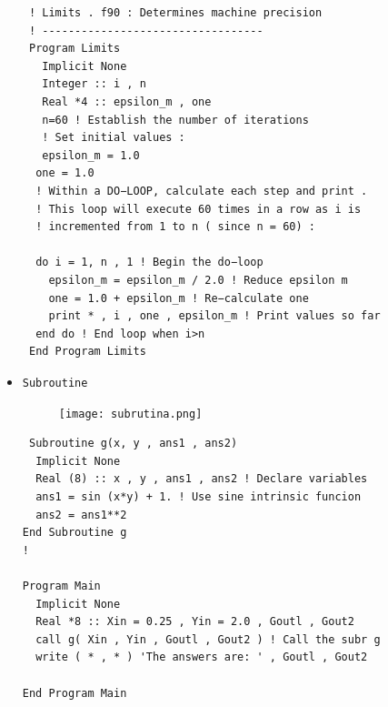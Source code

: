 \documentclass[12pt]{article}
\begin{document}
\begin{itemize}
 \begin{verbatim}
 ! Limits . f90 : Determines machine precision
 ! ----------------------------------
 Program Limits
   Implicit None
   Integer :: i , n
   Real *4 :: epsilon_m , one
   n=60 ! Establish the number of iterations
   ! Set initial values :
   epsilon_m = 1.0
  one = 1.0
  ! Within a DO−LOOP, calculate each step and print .
  ! This loop will execute 60 times in a row as i is
  ! incremented from 1 to n ( since n = 60) :

  do i = 1, n , 1 ! Begin the do−loop
    epsilon_m = epsilon_m / 2.0 ! Reduce epsilon m
    one = 1.0 + epsilon_m ! Re−calculate one
    print * , i , one , epsilon_m ! Print values so far
  end do ! End loop when i>n
 End Program Limits 
\end{verbatim}
 
 \item {\tt Subroutine}
 \begin{figure}[h]
\centering
 \texttt{[image: subrutina.png]}
\end{figure}
\begin{verbatim}
 Subroutine g(x, y , ans1 , ans2)
  Implicit None
  Real (8) :: x , y , ans1 , ans2 ! Declare variables
  ans1 = sin (x*y) + 1. ! Use sine intrinsic funcion
  ans2 = ans1**2
End Subroutine g
!

Program Main 
  Implicit None
  Real *8 :: Xin = 0.25 , Yin = 2.0 , Goutl , Gout2
  call g( Xin , Yin , Goutl , Gout2 ) ! Call the subr g
  write ( * , * ) 'The answers are: ' , Goutl , Gout2

End Program Main 
 \end{verbatim}
 

\end{itemize}
\end{document}
